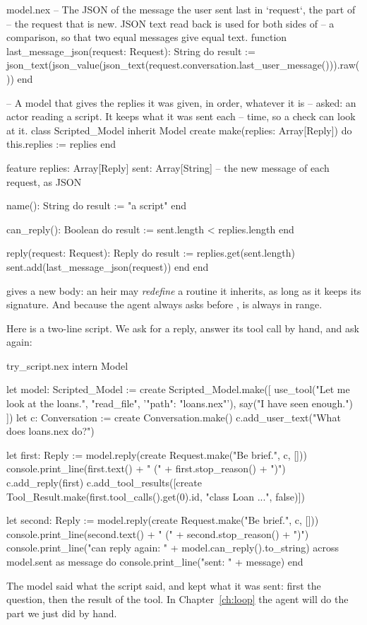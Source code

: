 \begin{append}{model.nex}
-- The JSON of the message the user sent last in `request`, the part of
-- the request that is new. JSON text read back is used for both sides of
-- a comparison, so that two equal messages give equal text.
function last_message_json(request: Request): String do
  result := json_text(json_value(json_text(request.conversation.last_user_message())).raw())
end

-- A model that gives the replies it was given, in order, whatever it is
-- asked: an actor reading a script. It keeps what it was sent each
-- time, so a check can look at it.
class Scripted_Model inherit Model
create
  make(replies: Array[Reply]) do
    this.replies := replies
  end

feature
  replies: Array[Reply]
  sent: Array[String]   -- the new message of each request, as JSON

  name(): String do
    result := "a script"
  end

  can_reply(): Boolean do
    result := sent.length < replies.length
  end

  reply(request: Request): Reply do
    result := replies.get(sent.length)
    sent.add(last_message_json(request))
  end
end
\end{append}

 gives  a new body: an heir may
\emph{redefine} a routine it inherits, as long as it keeps its signature.
And because the agent always asks  before ,
 is always in range.

Here is a two-line script. We ask for a reply, answer its tool call by
hand, and ask again:

\begin{tryit}{try_script.nex}
intern Model

let model: Scripted_Model := create Scripted_Model.make([
  use_tool("Let me look at the loans.", "read_file", '{"path": "loans.nex"}'),
  say("I have seen enough.")
])
let c: Conversation := create Conversation.make()
c.add_user_text("What does loans.nex do?")

let first: Reply := model.reply(create Request.make("Be brief.", c, []))
console.print_line(first.text() + " (" + first.stop_reason() + ")")
c.add_reply(first)
c.add_tool_results([create Tool_Result.make(first.tool_calls().get(0).id,
  "class Loan ...", false)])

let second: Reply := model.reply(create Request.make("Be brief.", c, []))
console.print_line(second.text() + " (" + second.stop_reason() + ")")
console.print_line("can reply again: " + model.can_reply().to_string)
across model.sent as message do
  console.print_line("sent: " + message)
end
\end{tryit}

The model said what the script said, and kept what it was sent: first the
question, then the result of the tool. In Chapter~\ref{ch:loop} the agent
will do the part we just did by hand.
